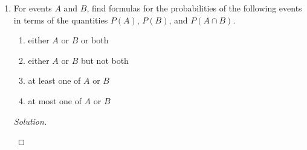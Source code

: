 \documentclass[12pt]{article}
\theoremstyle{definition}
\theoremstyle{plain}
\newenvironment{solution}
  {\begin{proof}[Solution]}
  {\end{proof}}
\newcommand{\Or}{\text{ or }}
\renewcommand{\And}{\text{ and }}
\begin{document}
\begin{enumerate}
\begin{solution}
\begin{enumerate}
	\item For associativity of set intersection, we proceed similarly.
		\begin{align*}
			x \in A \cap (B \cap C) &\iff x \in A  \And  x \in B \cap C \\
			& \iff x \in A \And (x \in B \And x \in C)\\
			& \iff (x \in A \And x \in B ) \And x \in C\\
			& \iff x \in A \cap B \And x \in C\\
			& \iff x \in (A \cap B) \cap C
		\end{align*}
		
	\item \begin{align*}
			x \in (A \cup B)^c & \iff x \notin (A \cup B)\\
			&\iff \neg (x \in A \cup B)\\
			&\iff \neg (x \in A \Or x \in B)\\
			&\iff x \notin A \And x \notin B\\
			&\iff x \in A^c \And x \in B^c\\
			&\iff x \in A^c \cap B^c
		\end{align*}
		\begin{align*}
			x \in (A \cap B)^c & \iff x \notin (A \cap B)\\
			&\iff \neg (x \in A \cap B)\\
			&\iff \neg (x \in A \And x \in B)\\
			&\iff x \notin A \Or x \notin B\\
			&\iff x \in A^c \Or x \in B^c\\
			&\iff x \in A^c \cup B^c
		\end{align*}
	\end{enumerate}
	\end{solution}
	
\item For events $ A $ and $ B $, find formulas for the probabilities of the following events in terms of the quantities $ P(A) $, $ P(B) $, and $ P(A \cap B) $.
	\begin{enumerate}
	\item either $ A $ or $ B $ or both
	\item either $ A $ or $ B $ but not both
	\item at least one of $ A $ or $ B $
	\item at most one of $ A $ or $ B$
	\end{enumerate}
	\begin{solution}
	\begin{enumerate}
	

\end{enumerate}
\end{solution}
\end{enumerate}
\end{document}
